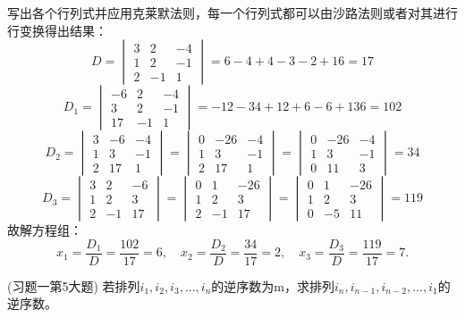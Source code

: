 \begin{solution}{}{}
    写出各个行列式并应用克莱默法则，每一个行列式都可以由沙路法则或者对其进行行变换得出结果：\[
    D=\begin{vmatrix}
        3&2&-4\\
        1&2&-1\\
        2&-1&1\end{vmatrix}=6-4+4-3-2+16=17\]
    \[
    D_1=\begin{vmatrix}
        -6&2&-4\\
        3&2&-1\\
        17&-1&1\end{vmatrix}= -12-34+12+6-6+136=102\]
    \[
    D_2=\begin{vmatrix}
        3&-6&-4\\
        1&3&-1\\
        2&17&1\end{vmatrix}=\begin{vmatrix}
        0&-26&-4\\
        1&3&-1\\
        2&17&1\end{vmatrix}=\begin{vmatrix}
            0&-26&-4\\
            1&3&-1\\
            0&11&3\end{vmatrix}=34\]
    \[D_3=\begin{vmatrix}
        3&2&-6\\
        1&2&3\\
        2&-1&17\end{vmatrix}=\begin{vmatrix}
        0&1&-26\\
        1&2&3\\
        2&-1&17\end{vmatrix}=\begin{vmatrix}
            0&1&-26\\
            1&2&3\\
            0&-5&11\end{vmatrix}=119
        \]
    故解方程组：\[x_1=\dfrac{D_1}{D}=\dfrac{102}{17}=6,\quad x_2=\dfrac{D_2}{D}=\dfrac{34}{17}=2,\quad x_3=\dfrac{D_3}{D}=\dfrac{119}{17}=7.\]
\end{solution}
\begin{example}{(习题一第5大题)}{}
    若排列$i_1,i_2,i_3,...,i_n$的逆序数为m，求排列$i_n,i_{n-1},i_{n-2},...,i_1$的逆序数。
\end{example}
